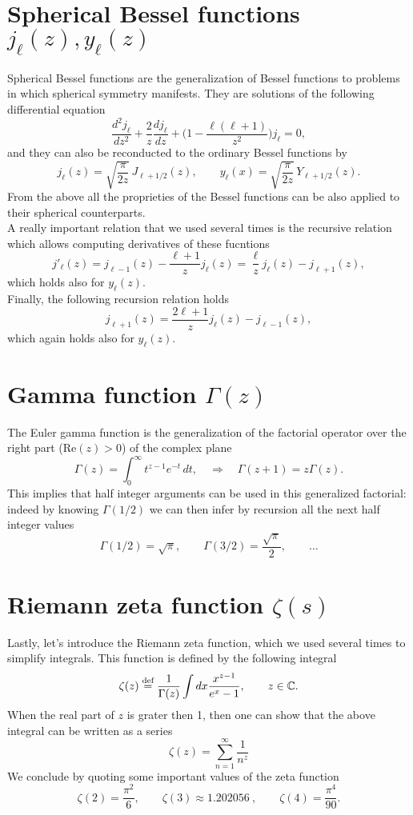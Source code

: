 \section{Spherical Bessel functions \(j_\ell(z), y_\ell(z)\)}
\label{app:sph_bessel}
Spherical Bessel functions are the generalization of Bessel functions to problems in which spherical symmetry manifests. They are solutions of the following differential equation
$$\frac{d^2j_\ell}{dz^2}+\frac{2}{z}\frac{dj_\ell}{dz}+\bigg(1-\frac{\ell(\ell+1)}{z^2}\bigg)j_\ell=0,$$
and they can also be reconducted to the ordinary Bessel functions by
\[
j_\ell(z)=\sqrt{\frac{\pi}{2z}}\,J_{\ell+1/2}(z),\qquad
y_\ell(x)=\sqrt{\frac{\pi}{2z}}\,Y_{\ell+1/2}(z).
\]
From the above all the proprieties of the Bessel functions can be also applied to their spherical counterparts.\\
A really important relation that we used several times is the recursive relation which allows computing derivatives of these fucntions
$$j'_\ell(z)=j_{\ell-1}(z)-\frac{\ell+1}{z}j_\ell(z)=\frac\ell zj_\ell(z)-j_{\ell+1}(z),$$
which holds also for $y_\ell(z).$\\Finally, the following recursion relation holds
$$j_{\ell+1}(z)=\frac{2\ell+1}{z}j_\ell(z)-j_{\ell-1}(z),$$
which again holds also for $y_\ell(z)$.
 
\section{Gamma function \(\Gamma(z)\)}
\label{app:gamma}
The Euler gamma function is the generalization of the factorial operator over the right part ($\text{Re}(z)>0$) of the complex plane
\[
\Gamma(z)=\int_0^\infty t^{z-1}e^{-t}\,dt,\quad\Rightarrow\quad \Gamma(z+1)=z\Gamma(z).
\]
This implies that half integer arguments can be used in this generalized factorial: indeed by knowing $\Gamma(1/2)$ we can then infer by recursion all the next half integer values 
\[
\Gamma\!\left(1/2\right)=\sqrt{\pi},\qquad
\Gamma\!\left(3/2\right)=\frac{\sqrt{\pi}}{2},\qquad\dots
\]

\section{Riemann zeta function \(\zeta(s)\)}
\label{app:zeta}
Lastly, let's introduce the Riemann zeta function, which we used several times to simplify integrals.
This function is defined by the following integral  
\[
\zeta(z)\stackrel{\text{def}}{=}\frac{1}{\Gamma(z)}\int dx\frac{x^{z-1}}{e^x-1},\qquad z\in \mathbb C.
\]
When the real part of $z$ is grater then 1, then one can show that the above integral can be written as a series
$$\zeta(z)=\sum_{n=1}^{\infty}\frac{1}{n^z}$$
We conclude by quoting some important values of the zeta function 
\[
\zeta(2)=\frac{\pi^2}{6},\qquad
\zeta(3)\approx 1.202056\ ,\qquad
\zeta(4)=\frac{\pi^4}{90}.
\]



